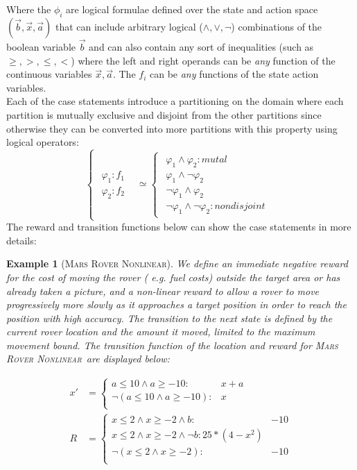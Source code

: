 \documentclass[letterpaper]{article}
\newcommand{\MarsRoverNL}{\textsc{Mars Rover Nonlinear}}
\newtheorem*{example*}{Example}
\begin{document}
Where the $\phi_i$ are logical formulae defined over the state and action space $(\vec{b},\vec{x},\vec{a})$ that can include arbitrary logical ($\land,\lor,\neg$) combinations of the boolean variable $\vec{b}$ and can also contain any sort of
inequalities (such as $\geq,>,\leq,<$) where the left and right operands can be \emph{any} function of the continuous variables $\vec{x},\vec{a}$. 
The $f_i$ can be \emph{any} functions of the state action variables.  
\\
Each of the case statements introduce a partitioning on the domain where each partition is mutually exclusive and disjoint from the other partitions since otherwise they can be converted into more partitions with this property using logical operators: 
{%
\begin{equation}
\begin{cases}
\begin{array}{c}
\varphi_{1}:f_{1}\\
\varphi_{2}:f_{2}
\end{array} & \simeq\begin{cases}
\begin{array}{c}
\varphi_{1}\wedge\varphi_{2}:mutal\\
\varphi_{1}\wedge\neg\varphi_{2}\\
\neg\varphi_{1}\wedge\varphi_{2}\\
\neg\varphi_{1}\wedge\neg\varphi_{2}:nondisjoint
\end{array}\end{cases}\end{cases}
\end{equation}
}
The reward and transition functions below can show the case statements in more details:

\begin{example*}[\MarsRoverNL]
We define an immediate negative reward for the cost of moving the rover ( e.g. fuel costs) outside the target area or has already taken a picture, and a non-linear reward to allow a rover to move progressively more slowly as it approaches a target position in order to reach the position with high accuracy. The transition to the next state is defined by the current rover location and the amount it moved, limited to the maximum movement bound.
The transition function of the location and reward for \MarsRoverNL\ are displayed below:
\end{example*}

{\footnotesize
\begin{align*}
x' & = \begin{cases}
a \leq 10 \wedge a\geq -10 : & x + a \\
\neg (a \leq 10 \wedge a\geq -10 ) : & x \\
\end{cases}\\
R & = \begin{cases}
x \leq 2 \wedge x \geq -2 \wedge b: & -10 \\
x \leq 2 \wedge x \geq -2 \wedge \neg b: 25 *(4 - x^2)  \\
\neg (x \leq 2 \wedge x \geq -2): &  -10 \\
\end{cases}
\end{align*}}
\end{document}
